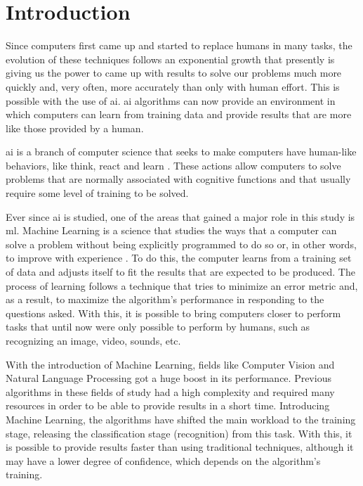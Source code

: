 \documentclass[
  twoside,
  11pt, a4paper,
  footinclude=true,
  headinclude=true,
  cleardoublepage=empty
]{scrbook}
\begin{document}
  \chapter{Introduction} \label{intro}
    Since computers first came up and started to replace humans in many tasks, the evolution of these techniques follows an exponential growth that presently is giving us the power to came up with results to solve our problems much more quickly and, very often, more accurately than only with human effort. This is possible with the use of \gls{ai}. \gls{ai} algorithms can now provide an environment in which computers can learn from training data and provide results that are more like those provided by a human.

    \gls{ai} is a branch of computer science that seeks to make computers have human-like behaviors, like think, react and learn \cite{russell2010artificial}. These actions allow computers to solve problems that are normally associated with cognitive functions and that usually require some level of training to be solved.   %

    Ever since \gls{ai} is studied, one of the areas that gained a major role in this study is \gls{ml}. Machine Learning is a science that studies the ways that a computer can solve a problem without being explicitly programmed to do so or, in other words, to improve with experience \cite{carbonell1983overview}. To do this, the computer learns from a training set of data and adjusts itself to fit the results that are expected to be produced. The process of learning follows a technique that tries to minimize an error metric and, as a result, to maximize the algorithm's performance in responding to the questions asked.
    With this, it is possible to bring computers closer to perform tasks that until now were only possible to perform by humans, such as recognizing an image, video, sounds, etc. %

    With the introduction of Machine Learning, fields like Computer Vision and Natural Language Processing got a huge boost in its performance. Previous algorithms in these fields of study had a high complexity and required many resources in order to be able to provide results in a short time. Introducing Machine Learning, the algorithms have shifted the main workload to the training stage, releasing the classification stage (recognition) from this task. With this, it is possible to provide results faster than using traditional techniques, although it may have a lower degree of confidence, which depends on the algorithm's training.
\end{document}

